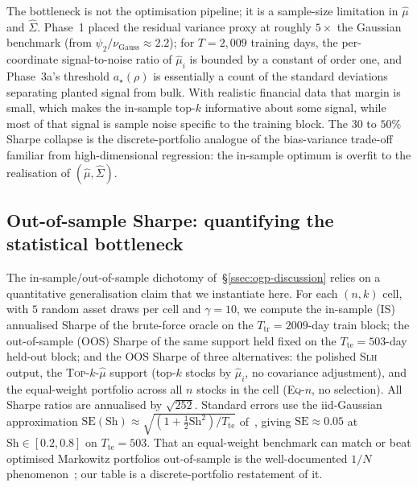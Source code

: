 The bottleneck is not the optimisation pipeline; it is a sample-size limitation in
$\hat\mu$ and $\hat\Sigma$. Phase~1 placed the residual variance proxy at roughly
$5\times$ the Gaussian benchmark (from $\psi_2/\nu_{\mathrm{Gauss}}\approx 2.2$); for
$T=2{,}009$ training days, the per-coordinate signal-to-noise ratio of $\hat\mu_i$ is
bounded by a constant of order one, and Phase~3a's threshold $a_\star(\rho)$ is
essentially a count of the standard deviations separating planted signal from bulk.
With realistic financial data that margin is small, which makes the in-sample top-$k$
informative about some signal, while most of that signal is sample noise specific to
the training block. The $30$ to $50\%$ Sharpe collapse is the discrete-portfolio
analogue of the bias-variance trade-off familiar from high-dimensional regression:
the in-sample optimum is overfit to the realisation of $(\hat\mu,\hat\Sigma)$.

\subsection{Out-of-sample Sharpe: quantifying the statistical bottleneck}
\label{sec:oos-sharpe}
 
The in-sample/out-of-sample dichotomy of~\S\ref{ssec:ogp-discussion} relies on a
quantitative generalisation claim that we instantiate here. For each $(n,k)$ cell,
with $5$ random asset draws per cell and $\gamma=10$, we compute the in-sample (IS)
annualised Sharpe of the brute-force oracle on the $T_{\mathrm{tr}}=2009$-day train
block; the out-of-sample (OOS) Sharpe of the same support held fixed on the
$T_{\mathrm{te}}=503$-day held-out block; and the OOS Sharpe of three alternatives:
the polished \textsc{Slh} output, the \textsc{Top-$k$-$\hat\mu$} support (top-$k$
stocks by $\hat\mu_i$, no covariance adjustment), and the equal-weight portfolio
across all $n$ stocks in the cell (\textsc{Eq-$n$}, no selection). All Sharpe ratios
are annualised by $\sqrt{252}$. Standard errors use the iid-Gaussian approximation
$\mathrm{SE}(\mathrm{Sh}) \approx \sqrt{(1+\tfrac{1}{2}\mathrm{Sh}^2)/T_{\mathrm{te}}}$
of~\cite{lo-sharpe}, giving $\mathrm{SE}\approx 0.05$ at
$\mathrm{Sh}\in[0.2,0.8]$ on $T_{\mathrm{te}}=503$. That an equal-weight benchmark can
match or beat optimised Markowitz portfolios out-of-sample is the well-documented
$1/N$ phenomenon~\cite{demiguel-garlappi-uppal}; our table is a discrete-portfolio
restatement of it.
 
